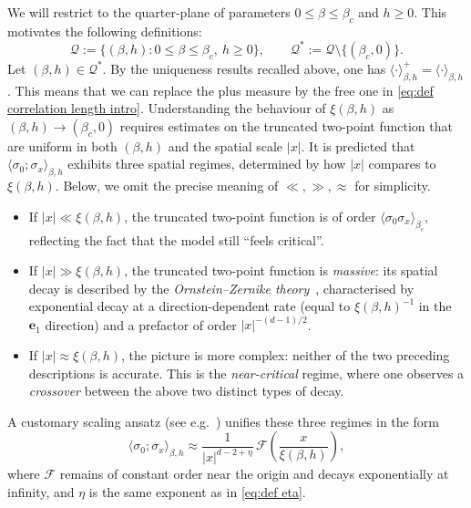 \documentclass[11pt,a4paper]{article}
\numberwithin{equation}{section}
\theoremstyle{plain}
\theoremstyle{definition}
\begin{document}
We will restrict to the quarter-plane of parameters $0\leq \beta\leq \beta_c$ and $h\geq 0$. This motivates the following definitions: 
\begin{equation}
    \mathcal Q:=\{(\beta,h):0\leq\beta\leq\beta_c,\ h\geq0\}, \qquad \mathcal Q^*:=\mathcal Q\setminus \{(\beta_c,0)\}.
\end{equation}
Let $(\beta,h)\in \mathcal Q^*$.
By the uniqueness results recalled above, one has $\langle\cdot\rangle_{\beta,h}^+ 
= \langle\cdot\rangle_{\beta,h}$. This means that we can replace the plus measure by the free one in \eqref{eq:def correlation length intro}. Understanding the behaviour of 
$\xi(\beta,h)$ as $(\beta,h)\to(\beta_c,0)$ requires estimates on the 
truncated two-point function that are uniform in both $(\beta,h)$ and the 
spatial scale $|x|$. It is predicted that $\langle\sigma_0;\sigma_x\rangle_{\beta,h}$ 
exhibits three spatial regimes, determined by how $|x|$ compares to 
$\xi(\beta,h)$.
Below, we omit the precise meaning of $\ll,\gg,\approx$ for simplicity.
\begin{itemize}
    \item If $|x|\ll\xi(\beta,h)$, the truncated two-point function 
    is of order $\langle \sigma_0\sigma_x\rangle_{\beta_c}$, 
    reflecting the fact that the model still ``feels critical''.

    \item If $|x|\gg\xi(\beta,h)$, the truncated two-point function is 
    \emph{massive}: its spatial 
    decay is described by the \emph{Ornstein--Zernike theory}~\cite{ornstein1914accidental,zernike1916clustering}, 
    characterised by exponential decay at a direction-dependent rate 
    (equal to $\xi(\beta,h)^{-1}$ in the $\mathbf{e}_1$ direction) and 
    a prefactor of order $|x|^{-(d-1)/2}$. 

    \item If $|x|\approx\xi(\beta,h)$, the picture is more complex: 
    neither of the two preceding descriptions is accurate. This is the 
    \emph{near-critical} regime, where one observes a \emph{crossover} between the above two distinct types of decay.
\end{itemize} A customary scaling
ansatz (see e.g.~\cite{Fisher1998renormalization}) unifies these three regimes in the form 
\begin{equation}\label{eq:expected behaviour in the near-critical regime}
    \langle\sigma_0;\sigma_x\rangle_{\beta,h}
    \approx
    \frac{1}{|x|^{d-2+\eta}}\,
    \mathcal F\left(\frac{x}{\xi(\beta,h)}\right),
\end{equation} 
where $\mathcal F$ remains of constant order near the origin and decays
exponentially at infinity, and $\eta$ is the same exponent as in \eqref{eq:def eta}.
%
\end{document}
